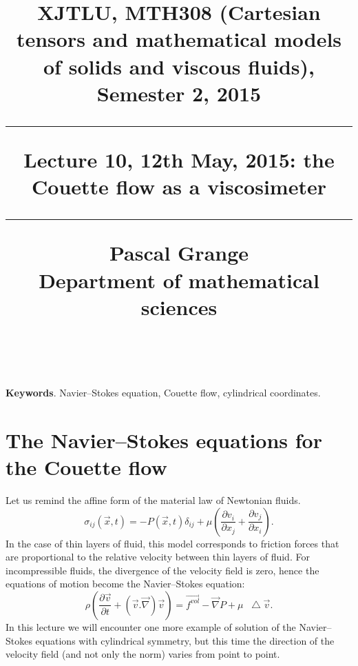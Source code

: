\documentclass[DIV=12]{article}
\newcommand*\Laplace{\mathop{}\!\mathbin\bigtriangleup}
\newcommand{\fVol}{\vec{f^{vol}}}
\begin{document}
\title{
\noindent\hrulefill
\begin{flushleft}
{\Large \bf{XJTLU, MTH308 (Cartesian tensors and mathematical models of solids and viscous fluids), Semester 2, 2015\\
\vspace{8mm}
\hrule
\vspace{6mm}
 Lecture 10, 12th May, 2015: the Couette flow as a viscosimeter}}
\vspace{8mm}
\hrule
\vspace{6mm}
{\Large{Pascal Grange\\
Department of mathematical sciences\\
{}\\
}}
\noindent\hrulefill
\end{flushleft}}
\date{}
\author{}
\maketitle
\vspace{-9mm}
 
{\bf{Keywords}}. Navier--Stokes equation, Couette flow, cylindrical coordinates.\\
\vspace{3mm}

\tableofcontents 

\vspace{8mm}





\section{The Navier--Stokes equations for the Couette flow}

Let us remind the affine form of the material law of Newtonian fluids.
\begin{equation}
\sigma_{ij}( \vec{x}, t ) = -P(\vec{x}, t ) \delta_{ij}+ \mu\left( \frac{\partial v_i}{\partial x_j} + \frac{\partial v_j}{\partial x_i}\right).
 \label{sigmaNewton}
\end{equation}
 In the case of thin layers of fluid, this model corresponds to friction forces that are proportional to the relative velocity 
 between thin layers of fluid. For incompressible fluids, the divergence of the velocity field is zero, hence the 
 equations of motion become the Navier--Stokes equation:
 \begin{equation}
 \rho\left( \frac{\partial \vec{v}}{\partial t} + ( \vec{v}.\vec{\nabla}) \vec{v}\right)= \fVol - \vec{\nabla} P + \mu \Laplace \vec{v}.
\label{NS}
 \end{equation}
In this lecture we will encounter one more example of solution of the Navier--Stokes 
 equations with cylindrical symmetry, but this time the direction of the velocity field (and not only the 
 norm) varies from point to point.
\end{document}
